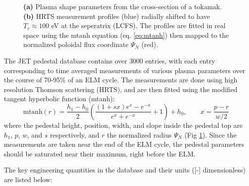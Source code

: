 \documentclass[a4paper, twoside, final, 12pt]{article}
\begin{document}
\begin{figure}
\begin{subfigure}{0.60\linewidth}
		\caption{}
		\label{subfig:mtanhfit}
	\end{subfigure}\hfill
	\caption{ \textbf{(a)} Plasma shape parameters from the cross-section of a tokamak. \textbf{(b)} HRTS measurement profiles (blue) radially shifted to have $T_e \approx 100$ eV at the seperatrix (LCFS). The profiles are fitted in real space using the mtanh equation (eq. \ref{eq:mtanh}) then mapped to the normalized poloidal flux coordinate $\Psi_N$ (red).}
	\label{fig:pedestal_db_figs}
\end{figure}

The JET pedestal database contains over 3000 entries, with each entry corresponding to time averaged measurements of various plasma parameters over the course of 70-95\% of an ELM cycle.
The measurements are done using high resolution Thomson scattering (HRTS)\cite{Pasqualotto_2004}, and are then fitted using the modified tangent hyperbolic function (mtanh): 
\begin{equation} \label{eq:mtanh}
\text{mtanh}(r) = \frac{h_1 - h_0}{2} \left( \frac{(1 + sx) e^x - e^{-x}}{e^x + e^{-x}} + 1\right) + h_0 , \quad \quad x=\frac{p-r}{w/2}
\end{equation}
where the pedestal height, position, width, and slope inside the pedestal top are $h_1$, $p$, $w$, and $s$ respectively, and $r$ the normalized radius $\Psi_N$ (Fig \ref{subfig:mtanhfit}). 
Since the measurements are taken near the end of the ELM cycle, the pedestal parameters should be saturated near their maximum, right before the ELM.

The key engineering quantities in the database and their units ([-] dimensionless) are listed below:
\end{document}
